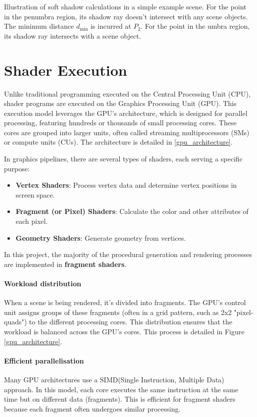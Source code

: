 {Illustration of soft shadow calculations in a simple example scene. For the point in the penumbra region, its shadow ray doesn't intersect with any scene objects. The minimum distance $d_{\text{min}}$ is incurred at $P_2$. For the point in the umbra region, its shadow ray intersects with a scene object.}


\section{Shader Execution}
\label{GPU}

Unlike traditional programming executed on the Central Processing Unit (CPU), shader programs are executed on the Graphics Processing Unit (GPU). This execution model leverages the GPU’s architecture, which is designed for parallel processing, featuring hundreds or thousands of small processing cores. These cores are grouped into larger units, often called streaming multiprocessors (SMs) or compute units (CUs). The architecture is detailed in \ref{gpu_architecture}.

In graphics pipelines, there are several types of shaders, each serving a specific purpose:
\begin{itemize}
    \item \textbf{Vertex Shaders}: Process vertex data and determine vertex positions in screen space.
    \item \textbf{Fragment (or Pixel) Shaders}: Calculate the color and other attributes of each pixel.
    \item \textbf{Geometry Shaders}: Generate geometry from vertices.
\end{itemize}

In this project, the majority of the procedural generation and rendering processes are implemented in \textbf{fragment shaders}.

\paragraph{Workload distribution}
When a scene is being rendered, it's divided into fragments. The GPU's control unit assigns groups of these fragments (often in a grid pattern, such as 2x2 "pixel-quads") to the different processing cores. This distribution ensures that the workload is balanced across the GPU's cores. This process is detailed in Figure \ref{gpu_architecture}.

\paragraph{Efficient parallelisation}
Many GPU architectures use a SIMD(Single Instruction, Multiple Data) approach. In this model, each core executes the same instruction at the same time but on different data (fragments). This is efficient for fragment shaders because each fragment often undergoes similar processing.

